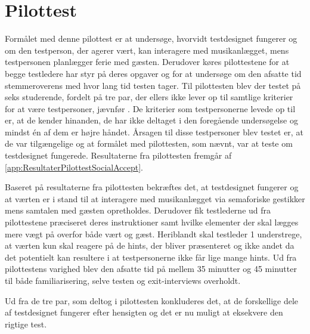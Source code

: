 \section{Pilottest}
\label{PilottestSocialAccept}
%
Formålet med denne pilottest er at undersøge, hvorvidt testdesignet fungerer og om den testperson, der agerer vært, kan interagere med musikanlægget, mens testpersonen planlægger ferie med gæsten. Derudover køres pilottestene for at begge testledere har styr på deres opgaver og for at undersøge om den afsatte tid stemmeroverens med hvor lang tid testen tager. \blankline
%
Til pilottesten blev der testet på seks studerende, fordelt på tre par, der ellers ikke lever op til samtlige kriterier for at være testpersoner, jævnfør . De kriterier som testpersonerne levede op til er, at de kender hinanden, de har ikke deltaget i den foregående undersøgelse og mindst én af dem er højre håndet. Årsagen til disse testpersoner blev testet er, at de var tilgængelige og at formålet med pilottesten, som nævnt, var at teste om testdesignet fungerede. Resultaterne fra pilottesten fremgår af \autoref{app:ResultaterPilottestSocialAccept}. 

Baseret på resultaterne fra pilottesten bekræftes det, at testdesignet fungerer og at værten er i stand til at interagere med musikanlægget via semaforiske gestikker mens samtalen med gæsten opretholdes. Derudover fik testlederne ud fra pilottestene præciseret deres instruktioner samt hvilke elementer der skal lægges mere vægt på overfor både vært og gæst. Heriblandt skal testleder 1 understrege, at værten kun skal reagere på de hints, der bliver præsenteret og ikke andet da det potentielt kan resultere i at testpersonerne ikke får lige mange hints. Ud fra pilottestens varighed blev den afsatte tid på mellem 35 minutter og 45 minutter til både familiarisering, selve testen og exit-interviews overholdt.

Ud fra de tre par, som deltog i pilottesten konkluderes det, at de forskellige dele af testdesignet fungerer efter hensigten og det er nu muligt at eksekvere den rigtige test. 

